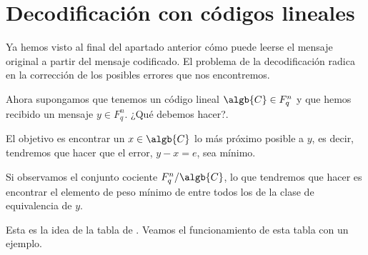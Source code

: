\section{Decodificación con códigos lineales}
Ya hemos visto al final del apartado anterior cómo puede leerse el mensaje original a partir del mensaje codificado. El problema de la decodificación radica en la corrección de los posibles errores que nos encontremos.

Ahora supongamos que tenemos un código lineal $\algb{C} \in F_q^n$ y que hemos recibido un mensaje $y \in F_q^n$. ¿Qué debemos hacer?.

El objetivo es encontrar un $x \in \algb{C}$ lo más próximo posible a $y$, es decir, tendremos que hacer que el error, $y-x=e$, sea mínimo.

Si observamos el conjunto cociente $F_q^n/\algb{C}$, lo que tendremos que hacer es encontrar el elemento de peso mínimo de entre todos los de la clase de equivalencia de $y$.

Esta es la idea de la tabla de . Veamos el funcionamiento de esta tabla con un ejemplo.

